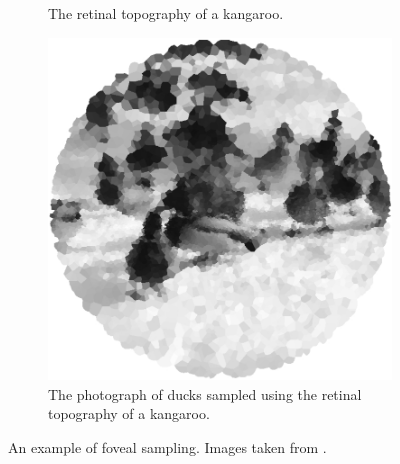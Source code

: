 \begin{figure}[htp]
\begin{subfigure}[t]{0.29\textwidth}
        \caption{The retinal topography of a kangaroo.}
    \end{subfigure} \hfill%
    \begin{subfigure}[t]{0.29\textwidth}
        \centering
        \captionsetup{justification=centering}
        \includegraphics[scale=0.34]{figures/fovealResult}
        \caption{The photograph of ducks sampled using the retinal topography of a kangaroo.}
    \end{subfigure}%
    \caption[Foveal Sampling]{An example of foveal sampling. Images taken from \cite{Foveal}.}
    \label{fig:foveal}
\end{figure}

\setlength{\leftskip}{0cm}
